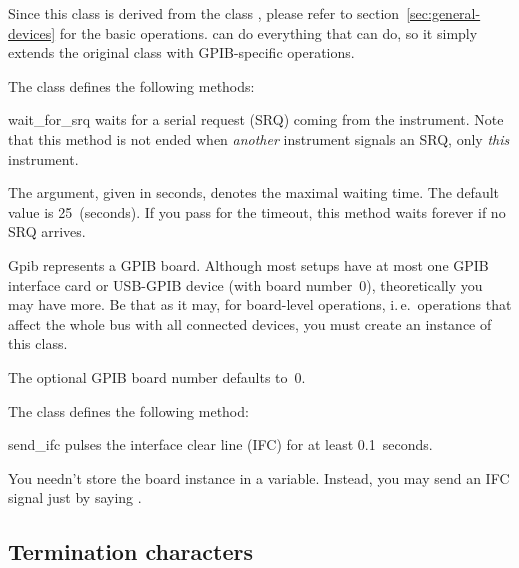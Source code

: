 \documentclass{howto}
\begin{document}
\begin{notice}
  Since this class is derived from the class , please refer
  to section~\ref{sec:general-devices} for the basic operations.
   can do everything that  can do, so
  it simply extends the original class with GPIB-specific operations.
\end{notice}

The class  defines the following methods:

\begin{methoddesc}{wait_for_srq}{}
  waits for a serial request (SRQ) coming from the instrument.  Note that this
  method is not ended when \emph{another} instrument signals an SRQ, only
  \emph{this} instrument.
  
  The  argument, given in seconds, denotes the maximal waiting
  time.  The default value is 25~(seconds).  If you pass  for the
  timeout, this method waits forever if no SRQ arrives.
\end{methoddesc}

\bigskip
\begin{classdesc}{Gpib}{}
  represents a GPIB board.  Although most setups have at most one GPIB
  interface card or USB-GPIB device (with board number~0), theoretically you
  may have more.  Be that as it may, for board-level operations, i.\,e.\
  operations that affect the whole bus with all connected devices, you must
  create an instance of this class.

  The optional GPIB board number  defaults to~0.
\end{classdesc}

The class  defines the following method:

\begin{methoddesc}{send_ifc}{}
  pulses the interface clear line (IFC) for at least 0.1~seconds.
\end{methoddesc}

\begin{notice}
You needn't store the board instance in a variable.  Instead, you may send an
IFC signal just by saying \samp{Gpib().send_ifc()}.
\end{notice}


\subsection{Termination characters}
\label{sec:termchars}
\end{document}
